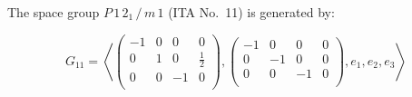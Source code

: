 The space group $P\, 1\, 2_1 \,/\, m\, 1$ (ITA No.~11) is generated by:

$$G_{11} = \left\langle\left(\begin{array}{rrr|r}
-1 & 0 & 0 & 0 \\
0 & 1 & 0 & \frac{1}{2} \\
0 & 0 & -1 & 0 \\
\end{array}\right) , \left(\begin{array}{rrr|r}
-1 & 0 & 0 & 0 \\
0 & -1 & 0 & 0 \\
0 & 0 & -1 & 0 \\
\end{array}\right) , e_1 , e_2 , e_3\right\rangle$$

